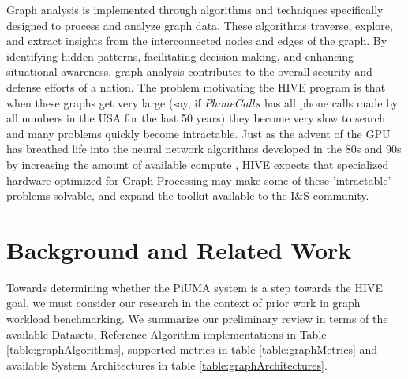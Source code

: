 \documentclass[letterpaper, 10pt]{article}
\begin{document}
\begin{multicols}{2}
        Graph analysis is implemented through algorithms and techniques specifically designed to process and analyze graph data. 
        These algorithms traverse, explore, and extract insights from the interconnected nodes and edges of the graph. By identifying hidden patterns, facilitating decision-making, and enhancing situational awareness, graph analysis contributes to the overall security and defense efforts of a nation. 
        The problem motivating the HIVE program is that when these graphs get very large (say, if $PhoneCalls$ has all phone calls made by all numbers in the USA for the last 50 years) they become very slow to search and many problems quickly become intractable.
        Just as the advent of the GPU has breathed life into the neural network algorithms developed in the 80s and 90s by increasing the amount of available compute \cite{Dally2021}, HIVE expects that specialized hardware optimized for Graph Processing may make some of these 'intractable' problems solvable, and expand the toolkit available to the I\&S community. 
        
    \section{Background and Related Work}\label{section:background}
        \par{Towards determining whether the PiUMA system is a step towards the HIVE goal, we must consider our research in the context of prior work in graph workload benchmarking. 
        We summarize our preliminary review in terms of the available Datasets, Reference Algorithm implementations in Table \ref{table:graphAlgorithms}, supported metrics in table \ref{table:graphMetrics} and available System Architectures in table \ref{table:graphArchitectures}.}


\end{multicols}
\end{document}
